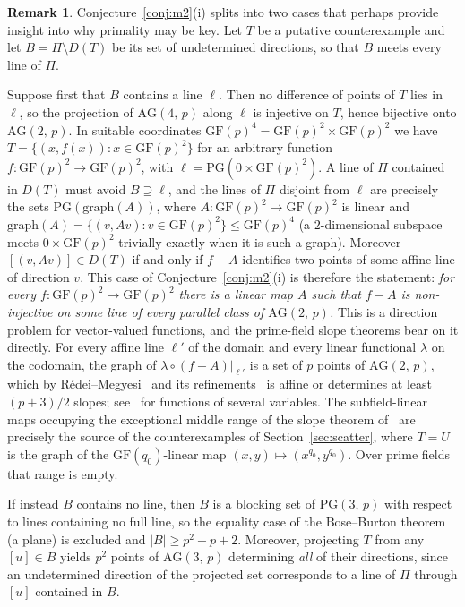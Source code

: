 \documentclass[12pt]{article}
\theoremstyle{definition}
\newtheorem{rem}[thm]{Remark}
\numberwithin{equation}{section}
\newcommand{\la}{\lambda}
\newcommand{\GF}[1]{\mathrm{GF}(#1)}
\newcommand{\PG}[2]{\mathrm{PG}(#1,\,#2)}
\newcommand{\PGv}[1]{\mathrm{PG}(#1)}
\newcommand{\AG}[2]{\mathrm{AG}(#1,\,#2)}
\begin{document}
\begin{rem}\label{rem:graphcase}
Conjecture~\ref{conj:m2}(i) splits into two cases that perhaps provide insight into why primality may be key.  Let $T$ be a putative counterexample and let $B=\Pi\setminus D(T)$ be its set of undetermined directions, so that $B$ meets every line of $\Pi$.

Suppose first that $B$ contains a line $\ell$.  Then no difference of points of $T$ lies in $\ell$, so the projection of $\AG{4}{p}$ along $\ell$ is injective on $T$, hence bijective onto $\AG{2}{p}$. In suitable coordinates $\GF{p}^{4}=\GF{p}^{2}\times\GF{p}^{2}$ we have $T=\{(x,f(x)):x\in\GF{p}^{2}\}$ for an arbitrary function $f:\GF{p}^{2}\to\GF{p}^{2}$, with $\ell=\PGv{0\times\GF{p}^{2}}$.  A line of $\Pi$ contained in $D(T)$ must avoid $B\supseteq\ell$, and the lines of $\Pi$ disjoint from $\ell$ are precisely the sets $\PGv{\mathrm{graph}(A)}$, where $A:\GF{p}^{2}\to\GF{p}^{2}$ is linear and $\mathrm{graph}(A)=\{(v,Av):v\in\GF{p}^{2}\}\le\GF{p}^{4}$ (a $2$-dimensional subspace meets $0\times\GF{p}^{2}$ trivially exactly when it is such a graph). Moreover $[(v,Av)]\in D(T)$ if and only if $f-A$ identifies two points of some affine line of direction $v$. This case of Conjecture~\ref{conj:m2}(i) is therefore the statement: \emph{for every $f:\GF{p}^{2}\to\GF{p}^{2}$ there is a linear map $A$ such that $f-A$ is non-injective on some line of every parallel class of $\AG{2}{p}$.}  This is a direction problem for vector-valued functions, and the prime-field slope theorems bear on it directly. For every affine line $\ell'$ of the domain and every linear functional $\la$ on the codomain, the graph of $\la\circ(f-A)\vert_{\ell'}$ is a set of $p$ points of $\AG{2}{p}$, which by R\'edei--Megyesi~\cite{MR0352060} and its refinements~\cite{MR1682973,MR2019280} is affine or determines at least $(p+3)/2$ slopes; see~\cite{MR2375464} for functions of several variables.  The subfield-linear maps occupying the exceptional middle range of the slope theorem of~\cite{MR2019280} are precisely the source of the counterexamples of Section~\ref{sec:scatter}, where $T=U$ is the graph of the $\GF{q_0}$-linear map $(x,y)\mapsto(x^{q_0},y^{q_0})$.  Over prime fields that range is empty.

If instead $B$ contains no line, then $B$ is a blocking set of $\PG{3}{p}$ with respect to lines containing no full line, so the equality case of the Bose--Burton theorem (a plane) is excluded and $|B|\geq p^{2}+p+2$. Moreover, projecting $T$ from any $[u]\in B$ yields $p^{2}$ points of $\AG{3}{p}$ determining \emph{all} of their directions, since an undetermined direction of the projected set corresponds to a line of $\Pi$ through $[u]$ contained in $B$.
\end{rem}
\end{document}
